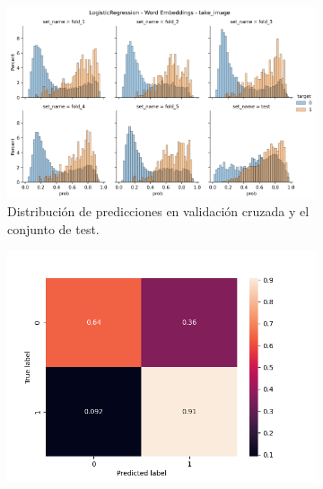 \begin{figure}
    \begin{subfigure}[b]{\textwidth}
        \centering
        \includegraphics[width=\linewidth]{figures/results/word_embeddings/lgr/take_image/lgr__distplot.png}
        \caption{Distribución de predicciones en validación cruzada y el conjunto de test.}
        \label{fig:my_label}
    \end{subfigure}
    \hfill
    \begin{subfigure}[b]{\textwidth}
      \includegraphics[width=\linewidth]{figures/results/word_embeddings/lgr/take_image/lgr_set_1_confusion_matrix_percent.png}
    \endminipage\hfill

\end{subfigure}
\end{figure}

